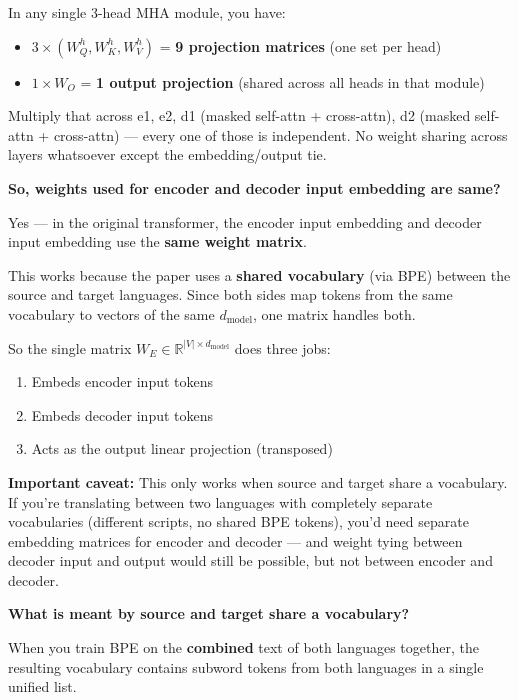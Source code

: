 In any single 3-head MHA module, you have:
\begin{itemize}
  \item $3 \times (W_Q^h, W_K^h, W_V^h)$ = \textbf{9 projection matrices} (one set per head)
  \item $1 \times W_O$ = \textbf{1 output projection} (shared across all heads in that module)
\end{itemize}

Multiply that across e1, e2, d1 (masked self-attn + cross-attn), d2 (masked self-attn + cross-attn) --- every one of those is independent. No weight sharing across layers whatsoever except the embedding/output tie.

\bigskip

\textbf{So, weights used for encoder and decoder input embedding are same?}

Yes --- in the original transformer, the encoder input embedding and decoder input embedding use the \textbf{same weight matrix}.

This works because the paper uses a \textbf{shared vocabulary} (via BPE) between the source and target languages. Since both sides map tokens from the same vocabulary to vectors of the same $d_{\text{model}}$, one matrix handles both.

So the single matrix $W_E \in \mathbb{R}^{|V| \times d_{\text{model}}}$ does three jobs:
\begin{enumerate}
  \item Embeds encoder input tokens
  \item Embeds decoder input tokens
  \item Acts as the output linear projection (transposed)
\end{enumerate}

\textbf{Important caveat:} This only works when source and target share a vocabulary. If you're translating between two languages with completely separate vocabularies (different scripts, no shared BPE tokens), you'd need separate embedding matrices for encoder and decoder --- and weight tying between decoder input and output would still be possible, but not between encoder and decoder.

\bigskip

\textbf{What is meant by source and target share a vocabulary?}

When you train BPE on the \textbf{combined} text of both languages together, the resulting vocabulary contains subword tokens from both languages in a single unified list.


